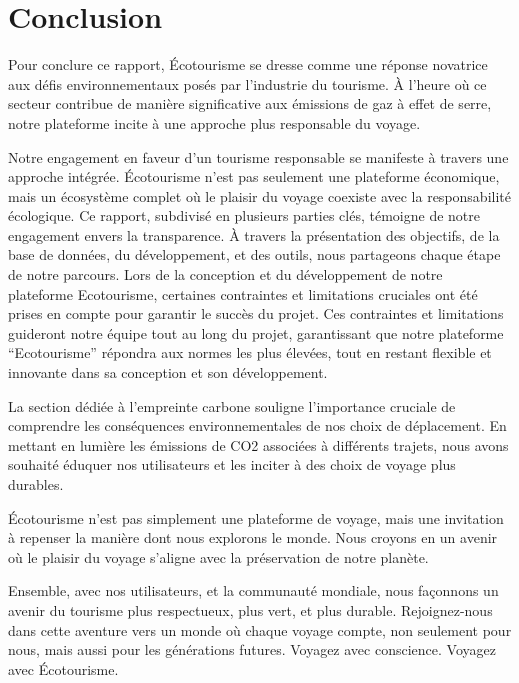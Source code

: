 \documentclass[mstat,12pt]{unswthesis}
\begin{document}
\begin{adjustwidth}{-2cm}{}
\hypertarget{conclusion}{%
\chapter{Conclusion}\label{conclusion}}

Pour conclure ce rapport, Écotourisme se dresse comme une réponse
novatrice aux défis environnementaux posés par l'industrie du tourisme.
À l'heure où ce secteur contribue de manière significative aux émissions
de gaz à effet de serre, notre plateforme incite à une approche plus
responsable du voyage.

\par

Notre engagement en faveur d'un tourisme responsable se manifeste à
travers une approche intégrée. Écotourisme n'est pas seulement une
plateforme économique, mais un écosystème complet où le plaisir du
voyage coexiste avec la responsabilité écologique. Ce rapport, subdivisé
en plusieurs parties clés, témoigne de notre engagement envers la
transparence. À travers la présentation des objectifs, de la base de
données, du développement, et des outils, nous partageons chaque étape
de notre parcours. Lors de la conception et du développement de notre
plateforme Ecotourisme, certaines contraintes et limitations cruciales
ont été prises en compte pour garantir le succès du projet. Ces
contraintes et limitations guideront notre équipe tout au long du
projet, garantissant que notre plateforme ``Ecotourisme'' répondra aux
normes les plus élevées, tout en restant flexible et innovante dans sa
conception et son développement.

\par

La section dédiée à l'empreinte carbone souligne l'importance cruciale
de comprendre les conséquences environnementales de nos choix de
déplacement. En mettant en lumière les émissions de CO2 associées à
différents trajets, nous avons souhaité éduquer nos utilisateurs et les
inciter à des choix de voyage plus durables.

\par

Écotourisme n'est pas simplement une plateforme de voyage, mais une
invitation à repenser la manière dont nous explorons le monde. Nous
croyons en un avenir où le plaisir du voyage s'aligne avec la
préservation de notre planète.

\par

Ensemble, avec nos utilisateurs, et la communauté mondiale, nous
façonnons un avenir du tourisme plus respectueux, plus vert, et plus
durable. Rejoignez-nous dans cette aventure vers un monde où chaque
voyage compte, non seulement pour nous, mais aussi pour les générations
futures. Voyagez avec conscience. Voyagez avec Écotourisme.





\end{adjustwidth}
\end{document}
